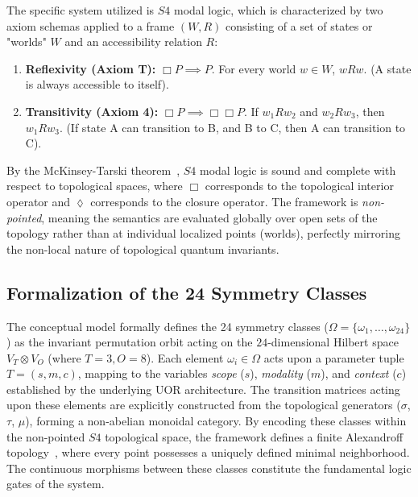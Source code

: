 The specific system utilized is $S4$ modal logic, which is characterized by two axiom schemas applied to a frame $(W, R)$ consisting of a set of states or "worlds" $W$ and an accessibility relation $R$:
\begin{enumerate}
    \item \textbf{Reflexivity (Axiom T):} $\Box P \implies P$. For every world $w \in W$, $wRw$. (A state is always accessible to itself).
    \item \textbf{Transitivity (Axiom 4):} $\Box P \implies \Box\Box P$. If $w_1Rw_2$ and $w_2Rw_3$, then $w_1Rw_3$. (If state A can transition to B, and B to C, then A can transition to C).
\end{enumerate}
By the McKinsey-Tarski theorem~\cite{mckinsey1944}, $S4$ modal logic is sound and complete with respect to topological spaces, where $\Box$ corresponds to the topological interior operator and $\lozenge$ corresponds to the closure operator. The framework is \textit{non-pointed}, meaning the semantics are evaluated globally over open sets of the topology rather than at individual localized points (worlds), perfectly mirroring the non-local nature of topological quantum invariants.

\subsection{Formalization of the 24 Symmetry Classes}
The conceptual model formally defines the 24 symmetry classes ($\Omega = \{\omega_1, \dots, \omega_{24}\}$) as the invariant permutation orbit acting on the $24$-dimensional Hilbert space $V_T \otimes V_O$ (where $T=3, O=8$). Each element $\omega_i \in \Omega$ acts upon a parameter tuple $T = (s, m, c)$, mapping to the variables \textit{scope} ($s$), \textit{modality} ($m$), and \textit{context} ($c$) established by the underlying UOR architecture. The transition matrices acting upon these elements are explicitly constructed from the topological generators ($\sigma$, $\tau$, $\mu$), forming a non-abelian monoidal category. By encoding these classes within the non-pointed $S4$ topological space, the framework defines a finite Alexandroff topology~\cite{alexandroff1937}, where every point possesses a uniquely defined minimal neighborhood. The continuous morphisms between these classes constitute the fundamental logic gates of the system.

